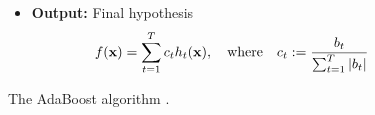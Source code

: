\begin{figure}[bth]
\begin{center}
\begin{center}
{{\begin{itemize}
          \item[]{\bf Output:} Final hypothesis
            \begin{equation}
              \label{fin_hyp}
              f({\bf x}) = \sum_{t=1}^{T} c_t h_{t}({\bf x}), \quad \mbox{where} \quad c_t:=\frac{b_t}{\sum_{t=1}^T |b_t|}
            \end{equation}
          \end{itemize}
          } 
          }
    \end{center}
  \end{center}
  \caption[]{The AdaBoost algorithm \cite{FreSch94}.\label{fig:ABALG}}
\end{figure}


